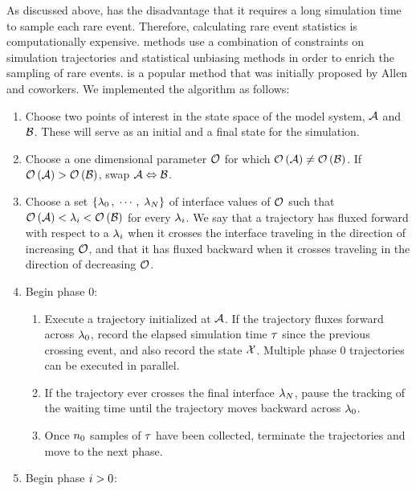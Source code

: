 As discussed above,  has the disadvantage that it requires a long simulation time to sample each rare event. Therefore, calculating rare event statistics is computationally expensive.  methods use a combination of constraints on simulation trajectories and statistical unbiasing methods in order to enrich the sampling of rare events.  is a popular  method that was initially proposed by Allen and coworkers\supercite{Allen:2005wy}. We implemented the  algorithm as follows:
\begin{enumerate}    
	\item Choose two points of interest in the state space of the model system, $\mathcal{A}$ and $\mathcal{B}$. These will serve as an initial and a final state for the simulation.
	\item Choose a one dimensional parameter $\mathcal{O}_{}$ for which $\mathcal{O}_{} \left( \mathcal{A} \right) \neq \mathcal{O}_{} \left( \mathcal{B} \right)$. If $\mathcal{O}_{} \left( \mathcal{A} \right) > \mathcal{O}_{} \left( \mathcal{B} \right)$, swap $\mathcal{A} \Leftrightarrow \mathcal{B}$.
	\item Choose a set $\left \{ {\lambda}_{0} \,, \; \cdots \,, \; {\lambda}_{N} \right \}$ of interface values of $\mathcal{O}_{}$ such that $\mathcal{O}_{} \left( \mathcal{A} \right) < {\lambda}_{i} < \mathcal{O}_{} \left( \mathcal{B} \right)$ for every ${\lambda}_{i}$. We say that a trajectory has fluxed forward with respect to a ${\lambda}_{i}$ when it crosses the interface traveling in the direction of increasing $\mathcal{O}_{}$, and that it has fluxed backward when it crosses traveling in the direction of decreasing $\mathcal{O}_{}$.
	\item Begin  phase 0:
        \begin{enumerate}
            \item Execute a  trajectory initialized at $\mathcal{A}$. If the trajectory fluxes forward across ${\lambda}_{0}$, record the elapsed simulation time $\tau$ since the previous crossing event, and also record the state $\mathcal{X}$. Multiple phase 0 trajectories can be executed in parallel.
            \item If the trajectory ever crosses the final interface ${\lambda}_{N}$, pause the tracking of the waiting time until the trajectory moves backward across ${\lambda}_{0}$.
            \item Once $n_{0}$ samples of $\tau$ have been collected, terminate the trajectories and move to the next phase.
        \end{enumerate}
    \item Begin  phase $i > 0$:

\end{enumerate}

